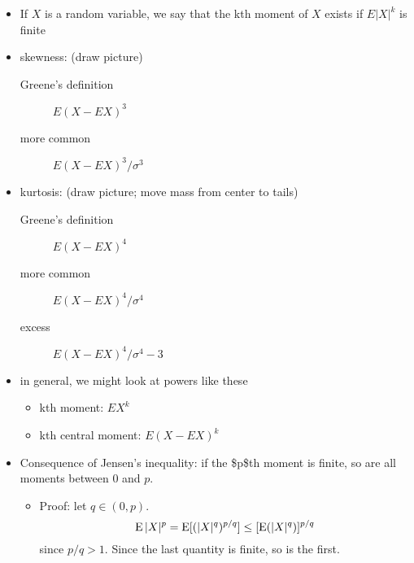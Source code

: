 \begin{itemize}
\item If $X$ is a random variable, we say that the kth moment of $X$
      exists if $E|X|^k$ is finite
\item skewness: (draw picture)
\begin{description}
\item[Greene's definition] $E(X - E X)^3$
\item[more common] $E(X - E X)^3 / \sigma^3$
\end{description}
\item kurtosis: (draw picture; move mass from center to tails)
\begin{description}
\item[Greene's definition] $E(X - E X)^4$
\item[more common] $E(X - E X)^4 / \sigma^4$
\item[excess] $E(X - E X)^4 / \sigma^4 - 3$
\end{description}
\item in general, we might look at powers like these
\begin{itemize}
\item kth moment: $E X^k$
\item kth central moment: $E(X - EX)^k$
\end{itemize}
\item Consequence of Jensen's inequality: if the \$p\$th moment is
      finite, so are all moments between 0 and $p$.
\begin{itemize}
\item Proof: let $q \in (0, p)$.  \[\operatorname{E} |X|^p = \operatorname{E}[( |X|^q)^{p/q}]
        \leq [\operatorname{E}(|X|^q)]^{p/q}\] since $p/q > 1$.  Since the last
        quantity is finite, so is the first.
\end{itemize}
\end{itemize}

